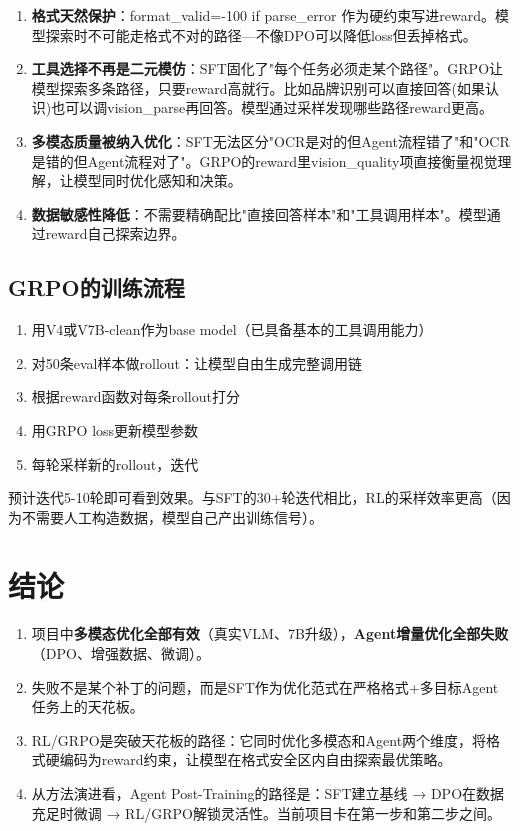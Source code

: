 \documentclass[fontset=none,11pt,a4paper]{ctexart}
\begin{document}
\begin{enumerate}[label=(\arabic*),nosep]
    \item \textbf{格式天然保护}：format\_valid=-100 if parse\_error 作为硬约束写进reward。模型探索时不可能走格式不对的路径---不像DPO可以降低loss但丢掉格式。
    \item \textbf{工具选择不再是二元模仿}：SFT固化了"每个任务必须走某个路径"。GRPO让模型探索多条路径，只要reward高就行。比如品牌识别可以直接回答(如果认识)也可以调vision\_parse再回答。模型通过采样发现哪些路径reward更高。
    \item \textbf{多模态质量被纳入优化}：SFT无法区分"OCR是对的但Agent流程错了"和"OCR是错的但Agent流程对了"。GRPO的reward里vision\_quality项直接衡量视觉理解，让模型同时优化感知和决策。
    \item \textbf{数据敏感性降低}：不需要精确配比"直接回答样本"和"工具调用样本"。模型通过reward自己探索边界。
\end{enumerate}

\subsection{GRPO的训练流程}

\begin{enumerate}[nosep]
    \item 用V4或V7B-clean作为base model（已具备基本的工具调用能力）
    \item 对50条eval样本做rollout：让模型自由生成完整调用链
    \item 根据reward函数对每条rollout打分
    \item 用GRPO loss更新模型参数
    \item 每轮采样新的rollout，迭代
\end{enumerate}

预计迭代5-10轮即可看到效果。与SFT的30+轮迭代相比，RL的采样效率更高（因为不需要人工构造数据，模型自己产出训练信号）。

\section{结论}

\begin{enumerate}[nosep]
    \item 项目中\textbf{多模态优化全部有效}（真实VLM、7B升级），\textbf{Agent增量优化全部失败}（DPO、增强数据、微调）。
    \item 失败不是某个补丁的问题，而是SFT作为优化范式在严格格式+多目标Agent任务上的天花板。
    \item RL/GRPO是突破天花板的路径：它同时优化多模态和Agent两个维度，将格式硬编码为reward约束，让模型在格式安全区内自由探索最优策略。
    \item 从方法演进看，Agent Post-Training的路径是：SFT建立基线 → DPO在数据充足时微调 → RL/GRPO解锁灵活性。当前项目卡在第一步和第二步之间。
\end{enumerate}
\end{document}
